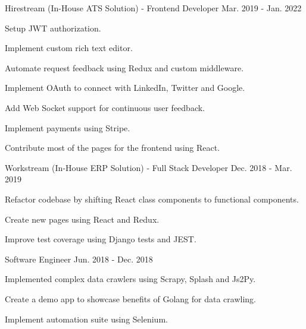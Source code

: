 \begin{cventries}
  \cventry
    {Hirestream (In-House ATS Solution) - Frontend Developer} %
    {} %
    {} %
    {Mar. 2019 - Jan. 2022} %
    {
      \begin{cvitems} %
        \item {Setup JWT authorization.}
        \item {Implement custom rich text editor.}
        \item {Automate request feedback using Redux and custom middleware.}
        \item {Implement OAuth to connect with LinkedIn, Twitter and Google.}
        \item {Add Web Socket support for continuous user feedback.}
        \item {Implement payments using Stripe.}
        \item {Contribute most of the pages for the frontend using React.}
      \end{cvitems}
    }

  \cventry
    {Workstream (In-House ERP Solution) - Full Stack Developer} %
    {} %
    {} %
    {Dec. 2018 - Mar. 2019} %
    {
      \begin{cvitems} %
        \item {Refactor codebase by shifting React class components to functional components.}
        \item {Create new pages using React and Redux.}
        \item {Improve test coverage using Django tests and JEST.}
      \end{cvitems}
    }

  \cventry
    {Software Engineer} %
    {} %
    {} %
    {Jun. 2018 - Dec. 2018} %
    {
      \begin{cvitems} %
        \item {Implemented complex data crawlers using Scrapy, Splash and Js2Py.}
        \item {Create a demo app to showcase benefits of Golang for data crawling.}
        \item {Implement automation suite using Selenium.}
      \end{cvitems}
    }

\end{cventries}
